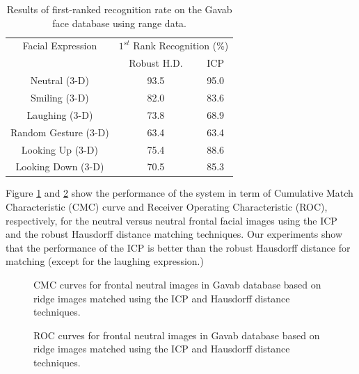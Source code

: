 \begin{table}
\centering
\begin{tabular}{|c|c|c|}
 \hline
  Facial Expression & \multicolumn{2}{c|}{$1^{st}$ Rank Recognition (\%)}\\
  \cline{2-3}
  &Robust H.D. & ICP\\
  \hline \hline
  Neutral (3-D) & 93.5 & 95.0\\
  Smiling (3-D) & 82.0 & 83.6\\
  Laughing (3-D) & 73.8 & 68.9\\
  Random Gesture (3-D) & 63.4 & 63.4\\
  Looking Up (3-D) & 75.4 & 88.6\\
  Looking Down (3-D) & 70.5 & 85.3\\
  \hline
\end{tabular}
\caption{Results of first-ranked recognition rate on the Gavab face
database using range data.}\label{table_results_GavabDB}
\end{table}

Figure \ref{fig_cmc_gavabDB} and \ref{fig_roc_gavabDB} show the
performance of the system in term of Cumulative Match Characteristic
(CMC) curve and Receiver Operating Characteristic (ROC),
respectively, for the neutral versus neutral frontal facial images
using the ICP and the robust Hausdorff distance matching techniques.
Our experiments show that the performance of the ICP is better than
the robust Hausdorff distance for matching (except for the laughing
expression.)

\begin{figure}[tbp]
\begin{center}
\caption{CMC curves for frontal neutral images in Gavab database
based on ridge images matched using the ICP and Hausdorff distance
techniques.} \label{fig_cmc_gavabDB}
\end{center}
\end{figure}

\begin{figure}[tbp]
\begin{center}
\caption{ROC curves for frontal neutral images in Gavab database
based on ridge images matched using the ICP and Hausdorff distance
techniques.} \label{fig_roc_gavabDB}
\end{center}
\end{figure}

